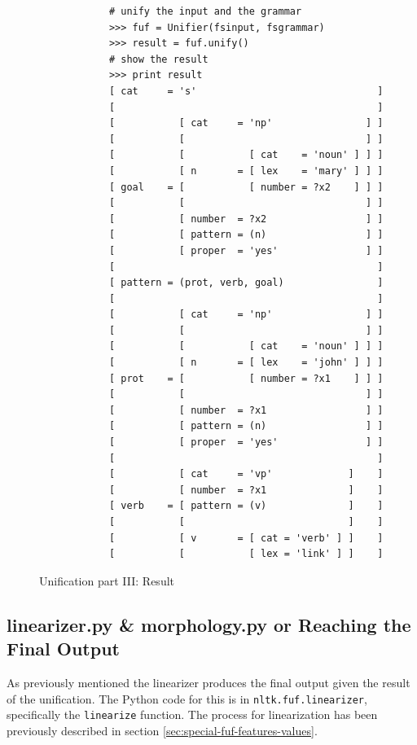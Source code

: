 \documentclass[12pt]{article}
\begin{document}
{\begin{figure}[h!]
    {\scriptsize
\begin{verbatim}
            # unify the input and the grammar
            >>> fuf = Unifier(fsinput, fsgrammar)
            >>> result = fuf.unify()
            # show the result
            >>> print result
            [ cat     = 's'                               ]
            [                                             ]
            [           [ cat     = 'np'                ] ]
            [           [                               ] ]
            [           [           [ cat    = 'noun' ] ] ]
            [           [ n       = [ lex    = 'mary' ] ] ]
            [ goal    = [           [ number = ?x2    ] ] ]
            [           [                               ] ]
            [           [ number  = ?x2                 ] ]
            [           [ pattern = (n)                 ] ]
            [           [ proper  = 'yes'               ] ]
            [                                             ]
            [ pattern = (prot, verb, goal)                ]
            [                                             ]
            [           [ cat     = 'np'                ] ]
            [           [                               ] ]
            [           [           [ cat    = 'noun' ] ] ]
            [           [ n       = [ lex    = 'john' ] ] ]
            [ prot    = [           [ number = ?x1    ] ] ]
            [           [                               ] ]
            [           [ number  = ?x1                 ] ]
            [           [ pattern = (n)                 ] ]
            [           [ proper  = 'yes'               ] ]
            [                                             ]
            [           [ cat     = 'vp'             ]    ]
            [           [ number  = ?x1              ]    ]
            [ verb    = [ pattern = (v)              ]    ]
            [           [                            ]    ]
            [           [ v       = [ cat = 'verb' ] ]    ]
            [           [           [ lex = 'link' ] ]    ]

\end{verbatim}
}
\caption{Unification part III: Result}
\label{fig:unification-three}
\end{figure}

\subsection{linearizer.py \& morphology.py or Reaching the Final Output}
As previously mentioned the linearizer produces the final output given the result of the unification. 
The Python code for this 
is in \texttt{nltk.fuf.linearizer}, specifically the \texttt{linearize} function. The process for 
linearization has been previously described in section \ref{sec:special-fuf-features-values}.

}
\end{document}
